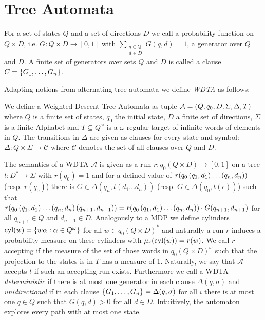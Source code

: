 \section{Tree Automata}
\begin{definition}[Generator]
  For a set of states $Q$ and a set of directions $D$ we call a probability
  function on $Q\times D$, i.e. $G: Q\times D\rightarrow [0,1]$ with
  $\sum\limits_{\substack{q\in Q\\ d\in D}}G(q,d) = 1$, a generator over $Q$
  and $D$. A finite set of generators over sets $Q$ and $D$ is called a clause
  $C = \left\{G_{1},\dots,G_{n}\right\}$.
\end{definition}
Adapting notions from alternating tree automata we define \emph{\ac{WDTA}} as
follows:
\begin{definition}
  We define a Weighted Descent Tree Automata as tuple
  $\mathcal{A} = \left(Q, q_{0}, D, \Sigma, \Delta, T\right)$ where $Q$ is a finite
  set of states, $q_{0}$ the initial state, $D$ a finite set of directions,
  $\Sigma$ is a finite Alphabet and $T\subseteq Q^{\omega}$ is a
  $\omega$-regular target of infinite words of elements in $Q$. The transitions
  in $\Delta$ are given as clauses for every state and symbol:
  $\Delta:Q\times\Sigma\rightarrow\mathcal{C}$
  where $\mathcal{C}$ denotes the set of all clauses over $Q$ and $D$.
\end{definition}
The semantics of a \ac{WDTA} $\mathcal{A}$ is given as a run
$r:q_{0}(Q\times D)\rightarrow [0,1]$ on a tree
$t:D^{*}\rightarrow\Sigma$ with $r(q_{0}) = 1$ and for a defined value
of $r(q_{0}\left(q_{1}, d_{1}\right)\dots\left(q_{n}, d_{n}\right))$ (resp. $r(q_{0})$)
there is $G\in\Delta(q_{n}, t(d_{1}\dots d_{n}))$ (resp. $G\in\Delta(q_{0},
t(\epsilon))$) such that
$r(q_{0}\left(q_{1}, d_{1}\right)\dots\left(q_{n}, d_{n}\right)\left(q_{n+1}, d_{n+1}\right))
= r(q_{0}\left(q_{1}, d_{1}\right)\dots\left(q_{n}, d_{n}\right))\cdot G(q_{n+1}, d_{n+1})$
for all $q_{n+1}\in Q$ and $d_{n+1}\in D$. Analogously to a \ac{MDP} we define
cylinders $\operatorname{cyl}(w) = \left\{w\alpha : \alpha\in Q^{\omega}\right\}$ for all
$w\in q_{0}(Q\times D)^{*}$ and naturally a run $r$ induces a
probability measure on these cylinders with $\mu_{r}(\operatorname{cyl}(w)) = r(w)$. We call
$r$ accepting if the measure of the set of those words in
$q_{0}(Q\times D)^{\omega}$ such that the projection to the states is in $T$
has a measure of 1. Naturally, we say that $\mathcal{A}$ accepts $t$ if such an
accepting run exists. Furthermore we call a \ac{WDTA} \emph{deterministic} if
there is at most one generator in each clause $\Delta(q, \sigma)$ and
\emph{unidirectional} if in each clause
$\left\{G_{1},\dots,G_{n}\right\} = \Delta(q, \sigma)$ for all $i$ there is at most one
$q\in Q$ such that $G(q, d) > 0$ for all $d\in D$. Intuitively, the automaton
explores every path with at most one state.


